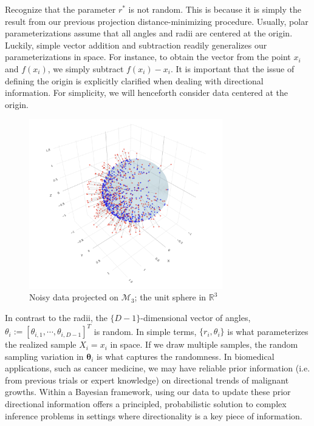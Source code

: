 \documentclass[twoside,11pt]{article}
\begin{document}
Recognize that the parameter $r^*$ is not random. This is because it is simply the result from our previous projection distance-minimizing procedure. Usually, polar parameterizations assume that all angles and radii are centered at the origin. Luckily, simple vector addition and subtraction readily generalizes our parameterizations in space. For instance, to obtain the vector from the point $x_i$ and $f(x_i)$, we simply subtract $f(x_i) - x_i$. It is important that the issue of defining the origin is explicitly clarified when dealing with directional information. For simplicity, we will henceforth consider data centered at the origin.

\begin{figure}[h!]
  \begin{center}
    \includegraphics[width=0.75\textwidth]{../fig/data-with-noise.png}
  \end{center}
  \caption{Noisy data projected on $\mathcal{M}_3$; the unit sphere in $\mathbb{R}^3$}\label{fig:data-with-noise}
\end{figure}



In contrast to the radii, the $\{D-1\}$-dimensional vector of angles, $\theta_i := [\theta_{i, 1}, \cdots, \theta_{i, D-1}]^T$ is random. In simple terms, $\{r_i, \theta_i\}$ is what parameterizes the realized sample $X_i = x_i$ in space. If we draw multiple samples, the random sampling variation in $\mathbf{\theta}_i$ is what captures the randomness. In biomedical applications, such as cancer medicine, we may have reliable prior information (i.e. from previous trials or expert knowledge) on directional trends of malignant growths. Within a Bayesian framework, using our data to update these prior directional information offers a principled, probabilistic solution to complex inference problems in settings where directionality is a key piece of information.   
\end{document}
